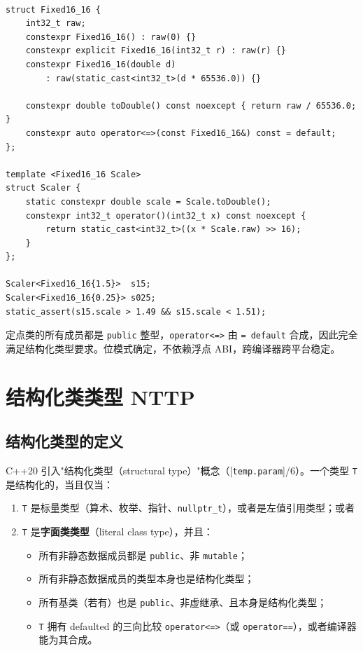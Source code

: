 \documentclass[12pt,a4paper,fontset=fandol]{ctexbook}
\newcommand{\cppxxlabel}[1]{%
  \tcbox[on line,colback=cpp20bg,colframe=cpp20bg,
    boxrule=0pt,arc=1pt,left=2pt,right=2pt,top=1pt,bottom=1pt,
    colupper=white,fontupper=\scriptsize\bfseries]{#1}}
\newcommand{\cpp}[1]{C++#1}
\newcommand{\kw}[1]{\texttt{#1}}
\begin{document}
\cppxxlabel{C++20}\ \begin{lstlisting}
struct Fixed16_16 {
    int32_t raw;
    constexpr Fixed16_16() : raw(0) {}
    constexpr explicit Fixed16_16(int32_t r) : raw(r) {}
    constexpr Fixed16_16(double d)
        : raw(static_cast<int32_t>(d * 65536.0)) {}

    constexpr double toDouble() const noexcept { return raw / 65536.0; }
    constexpr auto operator<=>(const Fixed16_16&) const = default;
};

template <Fixed16_16 Scale>
struct Scaler {
    static constexpr double scale = Scale.toDouble();
    constexpr int32_t operator()(int32_t x) const noexcept {
        return static_cast<int32_t>((x * Scale.raw) >> 16);
    }
};

Scaler<Fixed16_16{1.5}>  s15;
Scaler<Fixed16_16{0.25}> s025;
static_assert(s15.scale > 1.49 && s15.scale < 1.51);
\end{lstlisting}

定点类的所有成员都是 \kw{public} 整型，\kw{operator<=>} 由 \kw{= default} 合成，因此完全满足结构化类型要求。位模式确定，不依赖浮点 ABI，跨编译器跨平台稳定。

\chapter{结构化类类型 NTTP}\label{chap:structural}

\section{结构化类型的定义}

\cpp{20} 引入"结构化类型（structural type）"概念（[\texttt{temp.param}]/6）。一个类型 \kw{T} 是结构化的，当且仅当：

\begin{enumerate}
  \item \kw{T} 是标量类型（算术、枚举、指针、\kw{nullptr\_t}），或者是左值引用类型；或者
  \item \kw{T} 是\textbf{字面类类型}（literal class type），并且：
    \begin{itemize}
      \item 所有非静态数据成员都是 \kw{public}、非 \kw{mutable}；
      \item 所有非静态数据成员的类型本身也是结构化类型；
      \item 所有基类（若有）也是 \kw{public}、非虚继承、且本身是结构化类型；
      \item \kw{T} 拥有 defaulted 的三向比较 \kw{operator<=>}（或 \kw{operator==}），或者编译器能为其合成。
    \end{itemize}
\end{enumerate}
\end{document}
